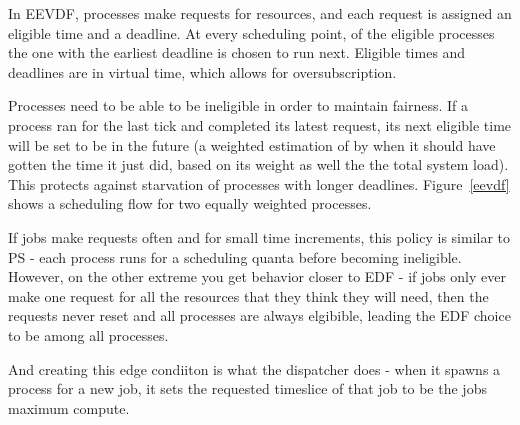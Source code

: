 In EEVDF, processes make requests for resources, and each request is assigned an
eligible time and a deadline. At every scheduling point, of the eligible
processes the one with the earliest deadline is chosen to run next. Eligible
times and deadlines are in virtual time, which allows for oversubscription. 

Processes need to be able to be ineligible in order to maintain fairness. If a
process ran for the last tick and completed its latest request, its next
eligible time will be set to be in the future (a weighted estimation of by when
it should have gotten the time it just did, based on its weight as well the the
total system load). This protects against starvation of processes with longer
deadlines. Figure~\ref{eevdf} shows a scheduling flow for two equally weighted
processes.

If jobs make requests often and for small time increments, this policy is
similar to PS - each process runs for a scheduling quanta before becoming
ineligible. However, on the other extreme you get behavior closer to EDF - if
jobs only ever make one request for all the resources that they think they will
need, then the requests never reset and all processes are always elgibible,
leading the EDF choice to be among all processes.

And creating this edge condiiton is what the dispatcher does - when it spawns a
process for a new job, it sets the requested timeslice of that job to be the
jobs maximum compute. 

